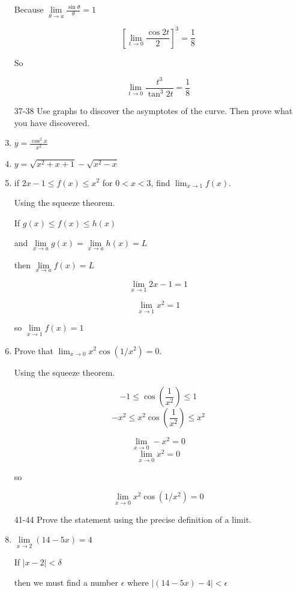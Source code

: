 \documentclass{article}
\begin{document}
\begin{enumerate}
			Because $\lim \limits _{\theta \to a} \frac{\sin \theta}{\theta} = 1$

			$$[ \lim \limits _{t \to 0} \frac{\cos 2t}{2} ]^3 = \frac{1}{8}$$

			So

			$$\lim \limits _{t \to 0} \frac{t^3}{\tan ^{3} 2t} = \frac{1}{8}$$

		\item[37-38] Use graphs to discover the asymptotes of the curve. Then prove what you have discovered.

		\item $y = \frac{\cos^2 x}{x^2}$

		\item $y = \sqrt{x^2 + x + 1} - \sqrt{x^2 - x}$

		\item if $2x - 1 \leq f(x) \leq x^2$ for $0 < x < 3$, find $\lim _{x \to 1} f(x)$.

			Using the squeeze theorem.

			If $g(x) \leq f(x) \leq h(x)$

			and $\lim \limits _{x \to a} g(x) = \lim \limits _{x \to a} h(x) = L$

			then $\lim \limits _{x \to a} f(x) = L$

			$$\lim \limits _{x \to 1} 2x - 1 = 1$$

			$$\lim \limits _{x \to 1} x^2 = 1$$

			so $\lim \limits _{x \to 1} f(x) = 1$

		\item Prove that $\lim _{x \to 0} x^2 \cos(1/x^2) = 0$.

			Using the squeeze theorem.

			$$-1 \leq \cos(\frac{1}{x^2}) \leq 1$$
			$$-x^2 \leq x^2 \cos(\frac{1}{x^2}) \leq x^2$$

			$$\lim \limits _{x \to 0} -x^2 = 0$$
			$$\lim \limits _{x \to 0} x^2 = 0$$

			so

			$$\lim \limits _{x \to 0} x^2 \cos(1/x^2) = 0$$

		\item[41-44] Prove the statement using the precise definition of a limit.

		\item $\lim \limits _{x \to 2} (14 - 5x) = 4$

			If $|x - 2| < \delta$

			then we must find a number $\epsilon$ where $|(14-5x) -4| < \epsilon$


\end{enumerate}
\end{document}
